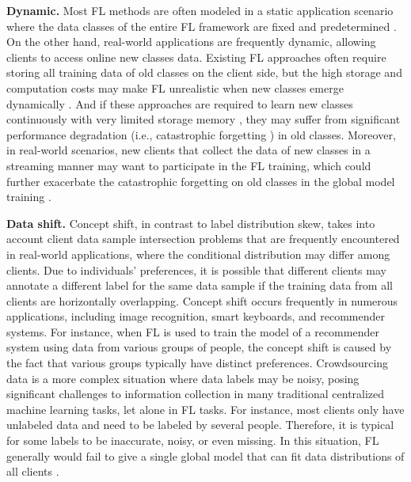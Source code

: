 \documentclass[10pt,journal,compsoc]{IEEEtran}
\begin{document}
	\textbf{Dynamic.}
	Most FL methods are often modeled in a static application scenario where the data classes of the entire FL framework are fixed and predetermined \cite{dong2022federated}. On the other hand, real-world applications are frequently dynamic, allowing clients to access online new classes data. Existing FL approaches often require storing all training data of old classes on the client side, but the high storage and computation costs may make FL unrealistic when new classes emerge dynamically \cite{nguyen2018crowdsourced} \cite{wang2021non} \cite{yang2021flop}. And if these approaches are required to learn new classes continuously with very limited storage memory \cite{shoham2019overcoming} \cite{yang2021flop}, they may suffer from significant performance degradation (i.e., catastrophic forgetting \cite{kirkpatrick2017overcoming} \cite{rebuffi2017icarl} \cite{shin2017continual}) in old classes. Moreover, in real-world scenarios, new clients that collect the data of new classes in a streaming manner may want to participate in the FL training, which could further exacerbate the catastrophic forgetting on old classes in the global model training \cite{dong2022federated}. 
	
	\textbf{Data shift.}
	Concept shift, in contrast to label distribution skew, takes into account client data sample intersection problems that are frequently encountered in real-world applications, where the conditional distribution may differ among clients. Due to individuals’ preferences, it is possible that different clients may annotate a different label for the same data sample if the training data from all clients are horizontally overlapping. Concept shift occurs frequently in numerous applications, including image recognition, smart keyboards, and recommender systems. For instance, when FL is used to train the model of a recommender system using data from various groups of people, the concept shift is caused by the fact that various groups typically have distinct preferences. Crowdsourcing data \cite{bassily2014private} is a more complex situation where data labels may be noisy, posing significant challenges to information collection in many traditional centralized machine learning tasks, let alone in FL tasks. For instance, most clients only have unlabeled data and need to be labeled by several people. Therefore, it is typical for some labels to be inaccurate, noisy, or even missing. In this situation, FL generally would fail to give a single global model that can fit data distributions of all clients \cite{fallah2020personalized} \cite{ghosh2020efficient} \cite{kairouz2021advances} \cite{mansour2020three} \cite{sattler2020clustered} \cite{smith2017federated} \cite{fu2021cic}.
	
\end{document}
